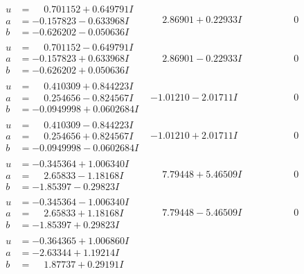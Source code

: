 \documentclass[1p]{elsarticle_modified}
\theoremstyle{definition}
\begin{document}
$$\begin{array}{c|c|c}
\begin{aligned}
u &= \phantom{-}0.701152 + 0.649791 I \\
a &= -0.157823 - 0.633968 I \\
b &= -0.626202 - 0.050636 I\end{aligned}
 & \phantom{-}2.86901 + 0.22933 I & \phantom{-0.000000 } 0 \\ \hline\begin{aligned}
u &= \phantom{-}0.701152 - 0.649791 I \\
a &= -0.157823 + 0.633968 I \\
b &= -0.626202 + 0.050636 I\end{aligned}
 & \phantom{-}2.86901 - 0.22933 I & \phantom{-0.000000 } 0 \\ \hline\begin{aligned}
u &= \phantom{-}0.410309 + 0.844223 I \\
a &= \phantom{-}0.254656 - 0.824567 I \\
b &= -0.0949998 + 0.0602684 I\end{aligned}
 & -1.01210 - 2.01711 I & \phantom{-0.000000 } 0 \\ \hline\begin{aligned}
u &= \phantom{-}0.410309 - 0.844223 I \\
a &= \phantom{-}0.254656 + 0.824567 I \\
b &= -0.0949998 - 0.0602684 I\end{aligned}
 & -1.01210 + 2.01711 I & \phantom{-0.000000 } 0 \\ \hline\begin{aligned}
u &= -0.345364 + 1.006340 I \\
a &= \phantom{-}2.65833 - 1.18168 I \\
b &= -1.85397 - 0.29823 I\end{aligned}
 & \phantom{-}7.79448 + 5.46509 I & \phantom{-0.000000 } 0 \\ \hline\begin{aligned}
u &= -0.345364 - 1.006340 I \\
a &= \phantom{-}2.65833 + 1.18168 I \\
b &= -1.85397 + 0.29823 I\end{aligned}
 & \phantom{-}7.79448 - 5.46509 I & \phantom{-0.000000 } 0 \\ \hline\begin{aligned}
u &= -0.364365 + 1.006860 I \\
a &= -2.63344 + 1.19214 I \\
b &= \phantom{-}1.87737 + 0.29191 I\end{aligned}

\end{array}$$
\end{document}
